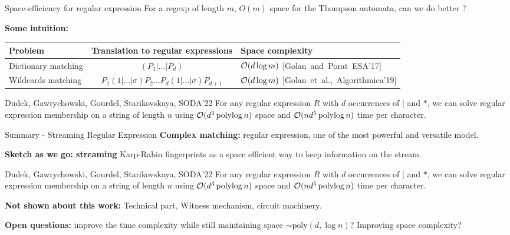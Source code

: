 {\renewcommand{\arraystretch}{2}
\begin{frame}{Space-efficiency for regular expression}
    For a regexp of length $m$, $O(m)$ space for the Thompson automata, can we do better ? \pause

    \medskip
    \textbf{Some intuition:}  \pause

    \medskip
    \begin{tabular}{l c p{}}
        Problem & Translation to regular expressions & Space complexity\\ 
        \hline \pause
        Dictionary matching & $(P_{1}|\ldots | P_{d})$ & $\mathcal{O}(d\log m)$  \mbox{\footnotesize [Golan~and~Porat~ESA'17]}\\ \pause
        Wildcards matching & $P_{1}(1|\ldots|\sigma)P_{2}\ldots P_{d}(1|\ldots|\sigma)P_{d+1}$ & $\mathcal{O}(d\log m)$ \mbox{\footnotesize [Golan et al.,~Algorithmica'19]} \pause
    \end{tabular}

    \medskip
    \begin{myalertblock}{Dudek, Gawrychowski, Gourdel, Starikovskaya, SODA'22}
        For any regular expression $R$ with $d$ occurrences of $|$ and $\ast$, we can solve regular expression membership on a string of length $n$ using $\mathcal{O}(d^{3}\operatorname{polylog} n)$ space and $\mathcal{O}(nd^{5}\operatorname{polylog} n)$ time per character.
    \end{myalertblock}
\end{frame}
}

\begin{frame}{Summary - Streaming Regular Expression}
    \textbf{Complex matching:} regular expression, one of the most powerful and versatile model.

    \vfill
    
    \textbf{Sketch as we go: streaming} Karp-Rabin fingerprints as a space efficient way to keep information on the stream.

    \begin{myalertblock}{Dudek, Gawrychowski, Gourdel, Starikovskaya, SODA'22}
        For any regular expression $R$ with $d$ occurrences of $|$ and $\ast$, we can solve regular expression membership on a string of length $n$ using $\mathcal{O}(d^{3}\operatorname{polylog} n)$ space and $\mathcal{O}(nd^{5}\operatorname{polylog} n)$ time per character.
    \end{myalertblock}
    \vfill
    \textbf{Not shown about this work:} Technical part, Witness mechanism, circuit machinery.

    \smallskip
    \textbf{Open questions:} improve the time complexity while still maintaining space $\sim \mathrm{poly}(d,\log n)$? Improving space complexity?
\end{frame}